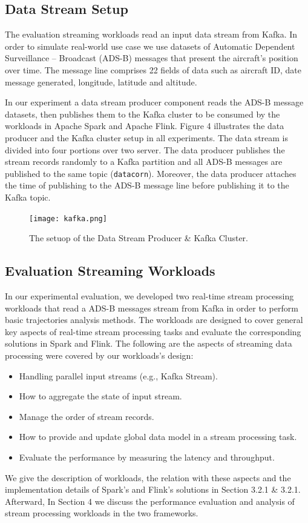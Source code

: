 \documentclass[]{article}
\begin{document}
\subsection{Data Stream Setup}
The evaluation streaming workloads read an input data stream from Kafka. In order to simulate real-world use case we use datasets of Automatic Dependent Surveillance – Broadcast (ADS-B) messages that present the aircraft's position over time. The message line comprises 22 fields of data such as aircraft ID, date message generated, longitude, latitude and altitude.
\par In our experiment a data stream producer component reads the ADS-B message datasets, then publishes them to the Kafka cluster to be consumed by the workloads in Apache Spark and Apache Flink. Figure 4 illustrates the data producer and the Kafka cluster setup in all experiments.
The data stream is divided into four portions over two server. The data producer publishes the stream records randomly to a Kafka partition and all ADS-B messages are published to the same topic (\texttt{datacorn}). Moreover, the data producer attaches the time of publishing to the ADS-B message line before publishing it to the Kafka topic.

\begin{figure}[h]
 
  \centering
    \texttt{[image: kafka.png]}
     \caption{The setuop of the Data Stream Producer \& Kafka Cluster.}
\end{figure} 

\subsection{Evaluation Streaming Workloads}
In our experimental evaluation, we developed two real-time stream processing workloads that read a ADS-B messages stream from Kafka in order to perform basic trajectories analysis methods. The workloads are designed to cover general key aspects of real-time stream processing tasks and evaluate the corresponding solutions in Spark and Flink. The following are the aspects of streaming data processing were covered by our workloads's design: 

\begin{itemize}
\item Handling parallel input streams (e.g., Kafka Stream).
\item How to aggregate the state of input stream.
\item Manage the order of stream records.
\item How to provide and update global data model in a stream processing task.
\item Evaluate the performance by measuring the latency and throughput.
\end{itemize}
We give the description of workloads, the relation with these aspects and  the implementation details of Spark's and Flink's solutions in Section 3.2.1 \& 3.2.1. Afterward, In Section 4 we discuss the performance evaluation and analysis of stream processing workloads in the two frameworks.
\end{document}
